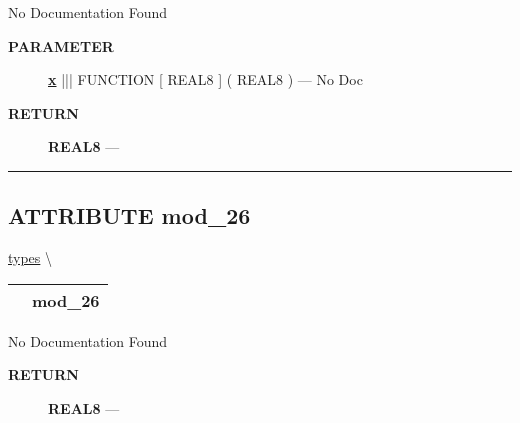 No Documentation Found






\par
\begin{description}
\item [\colorbox{tagtype}{\color{white} \textbf{\textsf{PARAMETER}}}] \textbf{\underline{x}} ||| FUNCTION [ REAL8 ] ( REAL8 ) --- No Doc
\end{description}







\par
\begin{description}
\item [\colorbox{tagtype}{\color{white} \textbf{\textsf{RETURN}}}] \textbf{REAL8} --- 
\end{description}




\rule{\linewidth}{0.5pt}
\subsection*{\textsf{\colorbox{headtoc}{\color{white} ATTRIBUTE}
mod\_26}}

\hypertarget{ecldoc:types.mod_26}{}
\hspace{0pt} \hyperlink{ecldoc:types}{types} \textbackslash 

{\renewcommand{\arraystretch}{1.5}
\begin{tabularx}{\textwidth}{|>{\raggedright\arraybackslash}l|X|}
\hline
\hspace{0pt}\mytexttt{\color{red} } & \textbf{mod\_26} \\
\hline
\end{tabularx}
}

\par





No Documentation Found








\par
\begin{description}
\item [\colorbox{tagtype}{\color{white} \textbf{\textsf{RETURN}}}] \textbf{REAL8} --- 
\end{description}




